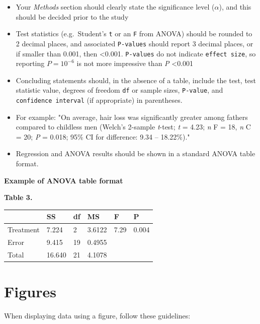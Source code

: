 \documentclass[
]{book}
\begin{document}
\begin{itemize}
\item
  Your \emph{Methods} section should clearly state the significance level (\(\alpha\)), and this should be decided prior to the study
\item
  Test statistics (e.g.~Student's \texttt{t} or an \texttt{F} from ANOVA) should be rounded to 2 decimal places, and associated \texttt{P-values} should report 3 decimal places, or if smaller than 0.001, then \textless0.001. \texttt{P-values} do not indicate \texttt{effect\ size}, so reporting \(P = 10^{-6}\) is not more impressive than \emph{P} \textless0.001
\item
  Concluding statements should, in the absence of a table, include the test, test statistic value, degrees of freedom \texttt{df} or sample sizes, \texttt{P-value}, and \texttt{confidence\ interval} (if appropriate) in parentheses.
\item
  For example: "On average, hair loss was significantly greater among fathers compared to childless men (Welch's 2-sample \emph{t}-test; \emph{t} = 4.23; \emph{n} F = 18, \emph{n} C = 20; \emph{P} = 0.018; 95\% CI for difference: 9.34 -- 18.22\%)."\\
\item
  Regression and ANOVA results should be shown in a standard ANOVA table format.
\end{itemize}

\textbf{Example of ANOVA table format}

\textbf{Table 3.}

\begin{longtable}[]{@{}llllll@{}}
\toprule()
& SS & df & MS & F & P \\
\midrule()
\endhead
Treatment & 7.224 & 2 & 3.6122 & 7.29 & 0.004 \\
Error & 9.415 & 19 & 0.4955 & & \\
Total & 16.640 & 21 & 4.1078 & & \\
\bottomrule()
\end{longtable}

\hypertarget{figures}{%
\section{Figures}\label{figures}}

When displaying data using a figure, follow these guidelines:
\end{document}
